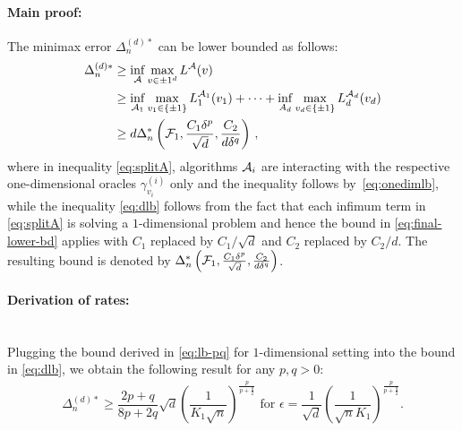 \paragraph{Main proof:}
The minimax error $\Delta_n^{(d)*}$ can be lower bounded as follows:
\begin{align}
\Delta_n^{(d)*}  &\ge  \inf_{\mathcal{A}} \max_{v\in {\pm 1}^d} L^{\mathcal{A}}(v) \nonumber\\
 & \ge \inf_{\mathcal{A}_1} \max_{v_1\in \{\pm 1\}} L_1^{\mathcal{A}_1}(v_1) + \dots + 
 			\inf_{A_d} \max_{v_d\in \{\pm 1 \}} L_d^{\mathcal{A}_d}(v_d) \label{eq:splitA}\\
               & \ge d \Delta_n^{*}\left(\mathcal{F}_1,\frac{C_1\delta^p}{\sqrt d}, \frac{C_2}{d\delta^q}\right)\,, \label{eq:dlb}
\end{align}
where in inequality \eqref{eq:splitA}, algorithms $\mathcal{A}_i$ are interacting with the respective one-dimensional oracles $\gamma^{(i)}_{v_i}$ only 
and the inequality follows by~\eqref{eq:onedimlb},
while the inequality \eqref{eq:dlb} follows from the fact that each infimum term in \eqref{eq:splitA} is solving a $1$-dimensional problem and hence the bound in \eqref{eq:final-lower-bd} applies with $C_1$ replaced by $C_1/\sqrt{d}$ and $C_2$ replaced by $C_2/d$. The resulting bound is denoted by $\Delta_n^{*}\left(\mathcal{F}_1,\frac{C_1\delta^p}{\sqrt d}, \frac{C_2}{d\delta^q}\right)$. 

\paragraph{Derivation of rates:}\ \\
Plugging the bound derived in \eqref{eq:lb-pq} for $1$-dimensional setting into the bound in \eqref{eq:dlb}, we obtain the following result for any $p, q >0$:
\begin{align}
\Delta_n^{(d)*} \ge  \dfrac{2p+q}{8p+2q}\sqrt{d}\left(\dfrac{1}{ K_1 \sqrt n}\right)^{\frac{p}{p+\frac{q}{2}}} \text{ for } 
\epsilon = \dfrac{1}{\sqrt{d}}\left(\dfrac{1}{\sqrt{n} K_1} \right)^{\frac{p}{p+\frac{q}{2}}}.
\label{eq:lb-pq-d}
\end{align}

